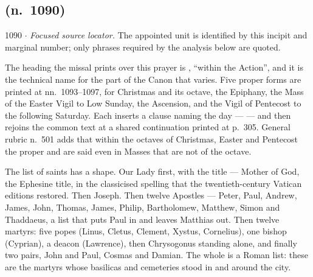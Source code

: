 \subsection*{ (n.~1090)}

\begin{appointed}{1090 $\cdot$ }
\textit{Focused source locator.} The appointed unit is identified by this incipit and marginal number; only phrases required by the analysis below are quoted.
\end{appointed}

The heading the missal prints over this prayer is ,
``within the Action'', and it is the technical name for the part of the Canon
that varies. Five proper forms are printed at nn.~1093--1097, for Christmas and
its octave, the Epiphany, the Mass of the Easter Vigil to Low Sunday, the
Ascension, and the Vigil of Pentecost to the following Saturday. Each inserts a
clause naming the day ---  --- and then rejoins the common text at a shared continuation printed at
p.~305. General rubric n.~501 adds that within the octaves of Christmas, Easter
and Pentecost the proper  and 
are said even in Masses that are not of the octave.

The list of saints has a shape. Our Lady first, with the title
 --- Mother of God, the
Ephesine title, in the classicised spelling  that the
twentieth-century Vatican editions restored. Then Joseph. Then twelve Apostles
--- Peter, Paul, Andrew, James, John, Thomas, James, Philip, Bartholomew,
Matthew, Simon and Thaddaeus, a list that puts Paul in and leaves Matthias out.
Then twelve martyrs: five popes (Linus, Cletus, Clement, Xystus, Cornelius),
one bishop (Cyprian), a deacon (Lawrence), then Chrysogonus standing alone, and
finally two pairs, John and Paul, Cosmas and Damian. The whole is a Roman list:
these are the martyrs whose basilicas and cemeteries stood in and around the
city.


